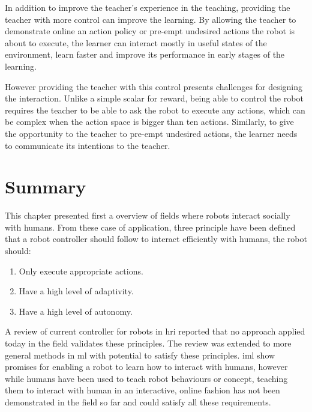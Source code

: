 In addition to improve the teacher's experience in the teaching, providing the teacher with more control can improve the learning. By allowing the teacher to demonstrate online an action policy or pre-empt undesired actions the robot is about to execute, the learner can interact mostly in useful states of the environment, learn faster and improve its performance in early stages of the learning.

However providing the teacher with this control presents challenges for designing the interaction. Unlike a simple scalar for reward, being able to control the robot requires the teacher to be able to ask the robot to execute any actions,  which can be complex when the action space is bigger than ten actions. Similarly, to give the opportunity to the teacher to pre-empt undesired actions, the learner needs to communicate its intentions to the teacher. %





\section{Summary}

This chapter presented first a overview of fields where robots interact socially with humans. From these case of application, three principle have been defined that a robot controller should follow to interact efficiently with humans, the robot should:
\begin{enumerate}
   	\item Only execute appropriate actions.
   	\item Have a high level of adaptivity.
   	\item Have a high level of autonomy.
\end{enumerate}

A review of current controller for robots in \gls{hri} reported that no approach applied today in the field validates these principles. The review was extended to more general methods in \acrlong{ml} with potential to satisfy these principles. \acrlong{iml} show promises for enabling a robot to learn how to interact with humans, however while humans have been used to teach robot behaviours or concept, teaching them to interact with human in an interactive, online fashion has not been demonstrated in the field so far and could satisfy all these requirements.